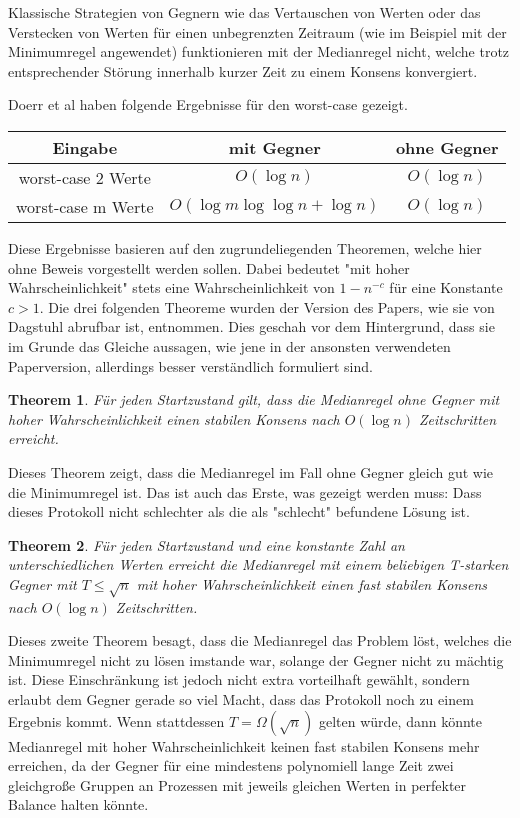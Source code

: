 \documentclass[12pt,ngerman,a4paper]{scrartcl}
\theoremstyle{plain}
\newtheorem{theorem}{Theorem}
\theoremstyle{definition}
\theoremstyle{remark}
\begin{document}
Klassische Strategien von Gegnern wie das Vertauschen von Werten oder das
Verstecken von Werten für einen unbegrenzten Zeitraum (wie im Beispiel mit
der Minimumregel angewendet) funktionieren mit der Medianregel nicht, welche
trotz entsprechender Störung innerhalb kurzer Zeit zu einem Konsens konvergiert.

Doerr et al\cite{Doerr2011} haben folgende Ergebnisse für den worst-case gezeigt.

\begin{tabular}{c|c|c}
    Eingabe & mit Gegner & ohne Gegner\\
    \hline
    worst-case 2 Werte & \(O(\log n)\) & \(O(\log n)\) \\
    \hline
    worst-case m Werte & \(O(\log m \log \log n + \log n)\) & \(O(\log n)\)
\end{tabular}

Diese Ergebnisse basieren auf den zugrundeliegenden Theoremen, welche hier ohne
Beweis vorgestellt werden sollen. Dabei bedeutet "mit hoher Wahrscheinlichkeit"
stets eine Wahrscheinlichkeit von $1 - n^{-c}$ für eine Konstante $c > 1$.
Die drei folgenden Theoreme wurden der Version des Papers, wie sie
von Dagstuhl abrufbar ist\cite{Doerr2010}, entnommen. Dies geschah vor dem
Hintergrund, dass sie im Grunde das Gleiche aussagen, wie jene in der ansonsten
verwendeten Paperversion\cite{Doerr2011}, allerdings besser verständlich
formuliert sind.

\begin{theorem}
Für jeden Startzustand gilt, dass die Medianregel ohne Gegner mit hoher
Wahrscheinlichkeit einen stabilen Konsens nach $O(\log n)$ Zeitschritten
erreicht.
\end{theorem}

Dieses Theorem zeigt, dass die Medianregel im Fall ohne Gegner gleich gut wie
die Minimumregel ist. Das ist auch das Erste, was gezeigt werden muss: Dass dieses
Protokoll nicht schlechter als die als "schlecht" befundene Lösung ist.

\begin{theorem}
Für jeden Startzustand und eine konstante Zahl an unterschiedlichen Werten erreicht
die Medianregel mit einem beliebigen T-starken Gegner mit $T \leq \sqrt{n}$ mit
hoher Wahrscheinlichkeit einen fast stabilen Konsens nach $O(\log n)$
Zeitschritten.
\end{theorem}

Dieses zweite Theorem besagt, dass die Medianregel das Problem löst, welches
die Minimumregel nicht zu lösen imstande war, solange der Gegner nicht zu mächtig
ist. Diese Einschränkung ist jedoch nicht extra vorteilhaft gewählt, sondern
erlaubt dem Gegner gerade so viel Macht, dass das Protokoll noch zu einem
Ergebnis kommt. Wenn stattdessen $T = \Omega(\sqrt{n})$ gelten würde, dann könnte
Medianregel mit hoher Wahrscheinlichkeit keinen fast stabilen Konsens mehr
erreichen, da der Gegner für eine mindestens polynomiell lange Zeit zwei
gleichgroße Gruppen an Prozessen mit jeweils gleichen Werten in perfekter Balance
halten könnte.
\end{document}
